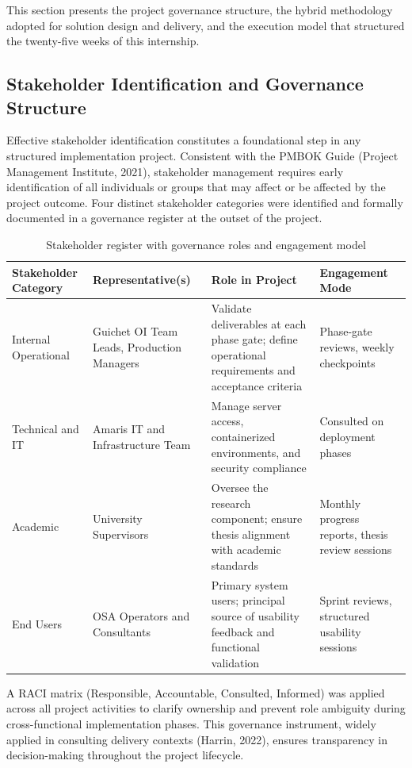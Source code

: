 This section presents the project governance structure, the hybrid methodology adopted for solution design and delivery, and the execution model that structured the twenty-five weeks of this internship.

\subsection{Stakeholder Identification and Governance Structure}

Effective stakeholder identification constitutes a foundational step in any structured implementation project. Consistent with the PMBOK Guide (Project Management Institute, 2021), stakeholder management requires early identification of all individuals or groups that may affect or be affected by the project outcome. Four distinct stakeholder categories were identified and formally documented in a governance register at the outset of the project.

\begin{table}[H]
  \centering
  \caption{Stakeholder register with governance roles and engagement model}
  \renewcommand{\arraystretch}{1.0}
  \footnotesize
  \begin{tabularx}{\textwidth}{|X|X|X|X|}
    \hline
    \textbf{Stakeholder Category} & \textbf{Representative(s)} & \textbf{Role in Project} & \textbf{Engagement Mode} \\ \hline
    Internal Operational & Guichet OI Team Leads, Production Managers & Validate deliverables at each phase gate; define operational requirements and acceptance criteria & Phase-gate reviews, weekly checkpoints \\ \hline
    Technical and IT & Amaris IT and Infrastructure Team & Manage server access, containerized environments, and security compliance & Consulted on deployment phases \\ \hline
    Academic & University Supervisors & Oversee the research component; ensure thesis alignment with academic standards & Monthly progress reports, thesis review sessions \\ \hline
    End Users & OSA Operators and Consultants & Primary system users; principal source of usability feedback and functional validation & Sprint reviews, structured usability sessions \\ \hline
  \end{tabularx}
\end{table}

A RACI matrix (Responsible, Accountable, Consulted, Informed) was applied across all project activities to clarify ownership and prevent role ambiguity during cross-functional implementation phases. This governance instrument, widely applied in consulting delivery contexts (Harrin, 2022), ensures transparency in decision-making throughout the project lifecycle.

